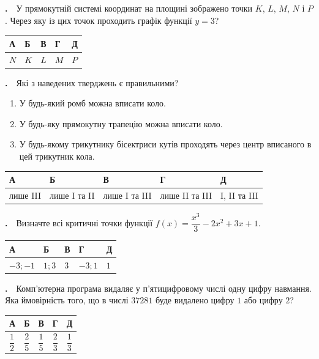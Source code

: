 \documentclass[12pt]{article}
\newcommand{\answerTable}[5]{%
\par\vspace{0.15cm}
\noindent
\begin{tabular}{|*{5}{>{\centering\arraybackslash}m{3cm}|}}
\hline
\rule[-0.15cm]{0pt}{0.6cm}\textbf{А} & \rule[-0.15cm]{0pt}{0.6cm}\textbf{Б} & \rule[-0.15cm]{0pt}{0.6cm}\textbf{В} & \rule[-0.15cm]{0pt}{0.6cm}\textbf{Г} & \rule[-0.15cm]{0pt}{0.6cm}\textbf{Д} \\
\hline
\rule[-0.2cm]{0pt}{0.75cm}#1 & \rule[-0.2cm]{0pt}{0.75cm}#2 & \rule[-0.2cm]{0pt}{0.75cm}#3 & \rule[-0.2cm]{0pt}{0.75cm}#4 & \rule[-0.2cm]{0pt}{0.75cm}#5 \\
\hline
\end{tabular}
\par\vspace{0.25cm}
}
\newcommand{\answerTableTall}[5]{%
\par\vspace{0.15cm}
\noindent
\begin{tabular}{|*{5}{>{\centering\arraybackslash}m{3cm}|}}
\hline
\rule[-0.2cm]{0pt}{0.7cm}\textbf{А} & \rule[-0.2cm]{0pt}{0.7cm}\textbf{Б} & \rule[-0.2cm]{0pt}{0.7cm}\textbf{В} & \rule[-0.2cm]{0pt}{0.7cm}\textbf{Г} & \rule[-0.2cm]{0pt}{0.7cm}\textbf{Д} \\
\hline
\rule[-0.45cm]{0pt}{1.2cm}#1 & \rule[-0.45cm]{0pt}{1.2cm}#2 & \rule[-0.45cm]{0pt}{1.2cm}#3 & \rule[-0.45cm]{0pt}{1.2cm}#4 & \rule[-0.45cm]{0pt}{1.2cm}#5 \\
\hline
\end{tabular}
\par\vspace{0.25cm}
}
\newcounter{zad}
\newcommand{\zadtask}[1]{\stepcounter{zad}\noindent\textbf{\thezad.}\ \ #1\par\vspace{0.2cm}}
\newcommand{\zadnum}{\stepcounter{zad}\textbf{\thezad.}\ \ }
\begin{document}
\noindent
\begin{minipage}[c]{0.58\textwidth}
\zadnum У прямокутній системі координат на площині зображено точки $K$, $L$, $M$, $N$ і $P$. Через яку із цих точок проходить графік функції $y=3$?
\end{minipage}%
\hfill
\begin{minipage}[c]{0.40\textwidth}
\centering
{}
\end{minipage}
\par\vspace{0.2cm}
\answerTable{$N$}{$K$}{$L$}{$M$}{$P$}

\zadtask{Які з наведених тверджень є правильними?
\vspace{0.1cm}
\begin{enumerate}[label=\textbf{\Roman*.}, align=left, leftmargin=2.6em, labelsep=0.5em, itemsep=0.08cm, topsep=0.06cm]
\item У будь-який ромб можна вписати коло.
\item У будь-яку прямокутну трапецію можна вписати коло.
\item У будь-якому трикутнику бісектриси кутів проходять через центр вписаного в цей трикутник кола.
\end{enumerate}
\vspace{0.15cm}}
\answerTable{лише III}{лише I та II}{лише I та III}{лише II та III}{I, II та III}
\newpage
\zadtask{Визначте всі критичні точки функції $f(x) = \dfrac{x^3}{3} - 2x^2 + 3x + 1$.}
\answerTable{$-3; -1$}{$1; 3$}{$3$}{$-3; 1$}{$1$}

\zadtask{Комп'ютерна програма видаляє у п'ятицифровому числі одну цифру навмання. Яка ймовірність того, що в числі $37281$ буде видалено цифру $1$ або цифру $2$?}
\answerTableTall{$\dfrac{1}{2}$}{$\dfrac{2}{5}$}{$\dfrac{1}{5}$}{$\dfrac{2}{3}$}{$\dfrac{1}{3}$}
\end{document}
